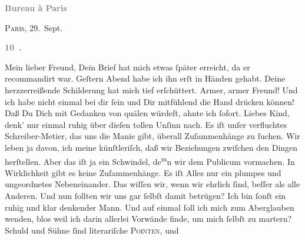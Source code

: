 \begin{ledgroupsized}[t]{13cm}
           \pstart
           \begin{otherlanguage}{french}\textcolor{gray}{\textbf{\textbf{Bureau à Paris}}}\end{otherlanguage}\hfill \textsc{Paris}, 29. Sept.\pend
           \pstart
           \begin{otherlanguage}{french}\textcolor{gray}{\textbf{\textbf{10 .}}}\end{otherlanguage}\pend
           \pstart\center{}Mein lieber Freund,\pend\pstart
           Dein Brief hat mich etwas ſpäter erreicht, da er recommandirt war. Geſtern{ }Abend habe ich ihn erſt in Händen gehabt. Deine herzzerreißende
               Schilderung hat mich tief erſchüttert. Armer, armer Freund! Und ich habe nicht einmal
               bei dir ſein und Dir mitfühlend die Hand drücken können!\pend
           \pstart
           Daß Du Dich mit Gedanken von \label{K_L02827-1v}\label{K_L02827-1h} quälen würdeſt, ahnte ich ſofort. Liebes Kind, denk’ nur einmal ruhig über
               dieſen tollen Unſinn nach. Es iſt unſer \strikeout{\textcolor{gray}{×}\-\textcolor{gray}{×}\-\textcolor{gray}{×}\-\textcolor{gray}{×}{ }\textcolor{gray}{×}\-\textcolor{gray}{×}\-\textcolor{gray}{×}\-\textcolor{gray}{×}\-\textcolor{gray}{×}\-\textcolor{gray}{×}{ }\textcolor{gray}{×}\-\textcolor{gray}{×}\-\textcolor{gray}{×}\-\textcolor{gray}{×}} verfluchtes Schreiber-{\pb}Metier, das uns die
               Manie gibt, überall Zuſammenhänge zu ſuchen. Wir leben ja davon, ich meine
               künſtleriſch, daß wir Beziehungen zwiſchen den Dingen herſtellen. Aber das iſt ja ein
               Schwindel, de\substVorne{}\textsuperscript{m}\substDazwischen{}n\substHinten{} wir dem Publicum vormachen. In Wirklichkeit gibt es keine Zuſammenhänge. Es
               iſt Alles nur ein plumpes und ungeordnetes Nebeneinander. Das wiſſen wir, wenn wir
               ehrlich ſind, beſſer als alle Anderen. Und nun ſollten wir uns gar ſelbſt damit
               betrügen? Ich bin ſonſt ein ruhig und klar denkender Mann. Und auf einmal ſoll ich
               mich zum Aber{\pb}glauben wenden, blos weil ich darin
               allerlei Vorwände finde\strikeout{\textcolor{gray}{n}}, um mich ſelbſt zu martern? Schuld und Sühne ſind literariſche \textsc{Pointen}, und

\end{ledgroupsized}
